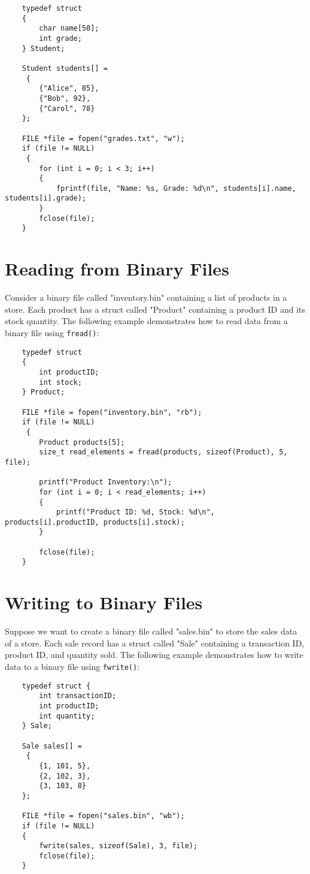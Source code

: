 \begin{verbatim}
	typedef struct 
	{
		char name[50];
		int grade;
	} Student;
	
	Student students[] =
	 {
		{"Alice", 85},
		{"Bob", 92},
		{"Carol", 78}
	};
	
	FILE *file = fopen("grades.txt", "w");
	if (file != NULL)
	 {
		for (int i = 0; i < 3; i++) 
		{
			fprintf(file, "Name: %s, Grade: %d\n", students[i].name, students[i].grade);
		}
		fclose(file);
	}
\end{verbatim}

\section{Reading from Binary Files}
Consider a binary file called "inventory.bin" containing a list of products in a store. 
Each product has a struct called "Product" containing a product ID and its stock quantity.
 The following example demonstrates how to read data from a binary file using {\tt fread()}:

\begin{verbatim}
	typedef struct 
	{
		int productID;
		int stock;
	} Product;
	
	FILE *file = fopen("inventory.bin", "rb");
	if (file != NULL)
	 {
		Product products[5];
		size_t read_elements = fread(products, sizeof(Product), 5, file);
		
		printf("Product Inventory:\n");
		for (int i = 0; i < read_elements; i++)
		{
			printf("Product ID: %d, Stock: %d\n", products[i].productID, products[i].stock);
		}
		
		fclose(file);
	}
\end{verbatim}

\section{Writing to Binary Files}
Suppose we want to create a binary file called "sales.bin" to store the sales data of a store. Each sale record has a struct called "Sale" containing a transaction ID, product ID, and quantity sold. The following example demonstrates how to write data to a binary file using {\tt fwrite()}:

\begin{verbatim}
	typedef struct {
		int transactionID;
		int productID;
		int quantity;
	} Sale;
	
	Sale sales[] =
	 {
		{1, 101, 5},
		{2, 102, 3},
		{3, 103, 8}
	};
	
	FILE *file = fopen("sales.bin", "wb");
	if (file != NULL) 
	{
		fwrite(sales, sizeof(Sale), 3, file);
		fclose(file);
	}
\end{verbatim}









